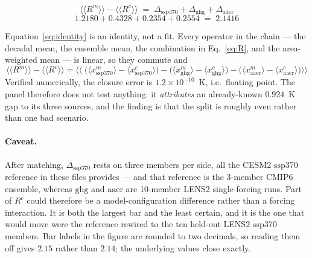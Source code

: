 \documentclass[11pt]{article}
\newcommand{\Xssp}{\mathrm{ssp370}}
\newcommand{\Xghg}{\mathrm{ghg}}
\newcommand{\Xaer}{\mathrm{aaer}}
\newcommand{\ameanN}[1]{\bigl\langle\!\bigl\langle #1 \bigr\rangle\!\bigr\rangle}
\begin{document}
\begin{equation}
\ameanN{R^{m}}-\ameanN{R^{c}}
 \;=\; \Delta_{\Xssp}+\Delta_{\Xghg}+\Delta_{\Xaer}
\label{eq:identity}
\end{equation}
\begin{equation*}
1.2180+0.4328+0.2354+0.2554 \;=\; 2.1416
\end{equation*}

Equation~\eqref{eq:identity} is an identity, not a fit. Every operator in
the chain --- the decadal mean, the ensemble mean, the combination in
Eq.~\eqref{eq:R}, and the area-weighted mean --- is linear, so they
commute and
\begin{equation}
\ameanN{R^{m}}-\ameanN{R^{c}}
 =\ameanN{\;\bigl(\langle x^{m}_{\Xssp}\rangle\!-\!\langle x^{c}_{\Xssp}\rangle\bigr)
          -\bigl(\langle x^{m}_{\Xghg}\rangle\!-\!\langle x^{c}_{\Xghg}\rangle\bigr)
          -\bigl(\langle x^{m}_{\Xaer}\rangle\!-\!\langle x^{c}_{\Xaer}\rangle\bigr)}
\end{equation}
Verified numerically, the closure error is $1.2\times10^{-10}$~K, i.e.\
floating point. The panel therefore does not test anything: it
\emph{attributes} an already-known $0.924$~K gap to its three sources,
and the finding is that the split is roughly even rather than one bad
scenario.

\paragraph{Caveat.} After matching, $\Delta_{\Xssp}$ rests on three
members per side, all the CESM2 $\Xssp$ reference in these files
provides --- and that reference is the 3-member CMIP6 ensemble, whereas
$\Xghg$ and $\Xaer$ are 10-member LENS2 single-forcing runs. Part of
$R^{c}$ could therefore be a model-configuration difference rather than a
forcing interaction. It is both the largest bar and the least certain,
and it is the one that would move were the reference rewired to the ten
held-out LENS2 $\Xssp$ members. Bar labels in the figure are rounded to
two decimals, so reading them off gives $2.15$ rather than $2.14$; the
underlying values close exactly.
\end{document}
